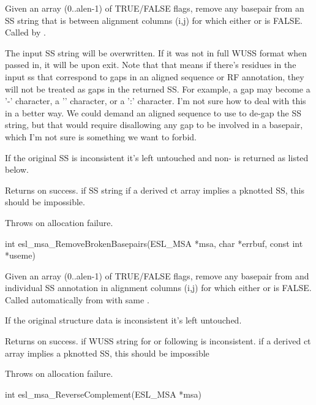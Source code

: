 \begin{sreapi}
Given an array  (0..alen-1) of TRUE/FALSE flags,
remove any basepair from an SS string that is between
alignment columns (i,j) for which either  or
 is FALSE.  Called by
.

The input SS string will be overwritten. If it was not
in full WUSS format when passed in, it will be upon
exit.  Note that that means if there's residues in the
input ss that correspond to gaps in an aligned sequence
or RF annotation, they will not be treated as gaps in
the returned SS. For example, a gap may become a '-'
character, a '\ccode{\_}' character, or a ':' character. I'm not
sure how to deal with this in a better way. We could
demand an aligned sequence to use to de-gap the SS
string, but that would require disallowing any gap to be
involved in a basepair, which I'm not sure is something
we want to forbid.

If the original SS is inconsistent it's left untouched
and non- is returned as listed below.

Returns  on success.
 if SS string 
 if a derived ct array implies a pknotted 
SS, this should be impossible.

Throws  on allocation failure.


\hypertarget{func:esl_msa_RemoveBrokenBasepairs()}
{\item[int esl\_msa\_RemoveBrokenBasepairs(ESL\_MSA *msa, char *errbuf, const int *useme)]}

Given an array  (0..alen-1) of TRUE/FALSE flags,
remove any basepair from  and individual SS
annotation in alignment columns (i,j) for which either
 or  is FALSE.  Called
automatically from  with same
.

If the original structure data is inconsistent it's left
untouched.

Returns  on success.
 if WUSS string for  or 
following  is inconsistent.
 if a derived ct array implies a pknotted 
SS, this should be impossible

Throws  on allocation failure.


\hypertarget{func:esl_msa_ReverseComplement()}
{\item[int esl\_msa\_ReverseComplement(ESL\_MSA *msa)]}


\end{sreapi}
